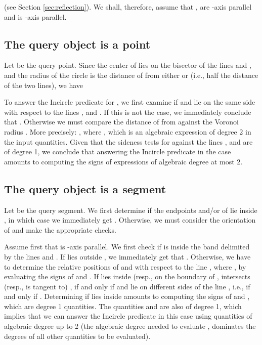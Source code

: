\documentclass[letterpaper,11pt]{article}
\newcommand{\incircle}{\textsf{Incircle}\xspace}
\newcommand{\vor}{Voronoi\xspace}
\newcommand{\sssp}{\xspace}
\begin{document}
{(see Section \ref{sec:reflection}).
We shall, therefore, assume that ,  are -axis parallel and 
 is -axis parallel.

\begin{comment}
\begin{figure}[b]
  \begin{center}
    \texttt{[image: china12]}
  \end{center}
  \caption{The Voronoi circle defined by the axes-aligned segments
    ,  and .}
  \label{fig:sss}
\end{figure}  
\end{comment}

\subsection{The query object is a point}\label{sec:sssp}
  
Let  be the query point. Since the center  of  lies
on the bisector of the lines  and , and the
radius  of the circle is the distance of  from either
 or  (i.e., half the distance of the two lines),
we have 


To answer the \incircle predicate for , we first examine if  and
 lie on the same side with respect to the lines ,
 and . If this is not the case, we immediately
conclude that . Otherwise we must compare 
the distance  of  from  against the \vor radius
. More precisely: ,
where ,
which is an algebraic expression of degree 2 in the input
quantities. Given that the sideness tests for  against the lines
,  and  are of degree 1, we conclude
that answering the \incircle predicate in the \sssp case amounts to
computing the signs of expressions of algebraic degree at most 2.



\subsection{The query object is a segment}\label{sec:ssss}

Let  be the query segment. We first determine if the endpoints 
and/or  of  lie inside , in which case we
immediately get . Otherwise, we must
consider the orientation of  and make the appropriate checks.

Assume first that  is -axis parallel. We first check if  is
inside the band  delimited by the lines  and
. If  lies outside , we immediately get that
. Otherwise, we have to determine the
relative positions of  and  with respect to the line ,
where , by evaluating the signs  
of  and . If  lies inside  (resp., on the
boundary  of ,  intersects (resp., is tangent to)
, if and only if  and  lie on different sides of
the line , i.e., if and only if
. Determining if  lies inside  amounts
to computing the signs of  and , which are degree 1
quantities. The quantities  and  are also of degree
1, which implies that we can answer the \incircle predicate in this
case using quantities of algebraic degree up to 2 (the algebraic
degree needed to evaluate , 
dominates the degrees of all other quantities to be evaluated).

}
\end{document}

